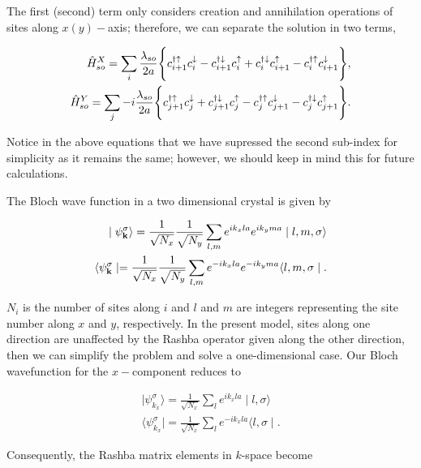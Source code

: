 \documentclass[10pt,prb,showpacs,amssymb,floatfix]{revtex4-1}
\begin{document}
The first (second) term only considers creation and annihilation operations of sites along $x(y)-$axis; therefore, we can separate the solution in two terms,

\begin{align}
\label{hsox}
\hat H^X_{so} = \sum_{i} \frac{\lambda_{so}}{2a}  \Bigg{\{}  c_{i+1}^{\dagger \uparrow} c_{i}^\downarrow -  c_{i+1}^{\dagger \downarrow} c_{i}^\uparrow  + c_{i}^{\dagger \downarrow} c_{i+1}^\uparrow - c_{i}^{\dagger \uparrow} c_{i+1}^\downarrow\Bigg{\}}, \\
\hat H^Y_{so} = \sum_{j}  -i\frac{\lambda_{so}}{2a} \Bigg{\{} c_{j+1}^{\dagger \uparrow} c_{j}^\downarrow +  c_{j+1}^{\dagger \downarrow} c_{j}^\uparrow - c_{j}^{\dagger \uparrow} c_{j+1}^\downarrow   - c_{j}^{\dagger \downarrow} c_{j+1}^\uparrow \Bigg{\}}.
\label{hsoy}
\end{align}

Notice in the above equations that we have supressed the second sub-index for simplicity as it remains the same; however, we should keep in mind this for future calculations.

The Bloch wave function in a two dimensional crystal is given by

\begin{align}
\mid \psi^\sigma_{\bf k} \rangle = \frac{1}{\sqrt{N_x}}\frac{1}{\sqrt{N_y}} \sum_{l, m} e^{ik_xla}e^{ik_yma} \mid l, m,\sigma\rangle \\
\langle \psi^\sigma_{\bf k} \mid = \frac{1}{\sqrt{N_x}}\frac{1}{\sqrt{N_y}} \sum_{l, m} e^{-ik_xla}e^{-ik_yma} \langle l, m,\sigma\mid.
\end{align}

$N_i$ is the number of sites along $i$ and $l$ and $m$ are integers representing the site number along $x$ and $y$, respectively. In the present model, sites along one direction are unaffected by the Rashba operator given along the other direction, then we can simplify the problem and solve a one-dimensional case. Our Bloch wavefunction for the $x-$component reduces to

\begin{align}
\mid \psi^\sigma_{k_x} \rangle = \frac{1}{\sqrt{N_x}} \sum_{l} e^{ik_xla} \mid l,\sigma\rangle \\
\langle \psi^\sigma_{k_x} \mid = \frac{1}{\sqrt{N_x}} \sum_{l} e^{-ik_xla} \langle l,\sigma\mid.
\end{align}

Consequently, the Rashba matrix elements in $k$-space become
\end{document}
